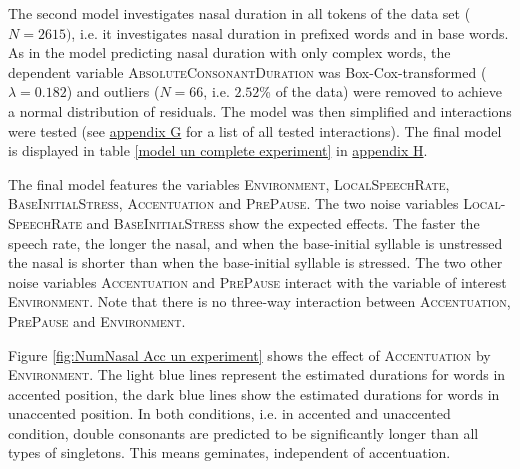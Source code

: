 The second model investigates nasal duration in all tokens of the data set ($N=2615)$, i.e. it investigates nasal duration in prefixed words and in base words. 
As in the model predicting nasal duration with only complex words, the dependent variable \textsc{AbsoluteConsonantDuration} was Box-Cox-transformed ($\lambda= 0.182$) and outliers ($N=66$, i.e. $ 2.52$\% of the data) were removed to achieve a normal distribution of residuals. The model was then simplified and interactions were tested (see \hyperref[Appendix G Summaries of tested interactions in experimental study]{appendix G} for a list of all tested interactions). The final model is displayed in table \ref{model un complete experiment} in \hyperref[Appendix H: Model Summaries Experiment]{appendix H}.


The final model features the variables \textsc{Environment}, \textsc{LocalSpeechRate}, \textsc{BaseInitialStress}, \textsc{Accentuation} and \textsc{PrePause}.
The two noise variables \textsc{Local-SpeechRate} and \textsc{BaseInitialStress} show the expected effects. The faster the speech rate, the longer the nasal, and when the base-initial syllable is unstressed the nasal is shorter than when the base-initial syllable is stressed.
The two other noise variables \textsc{Accentuation} and \textsc{PrePause} interact with the variable of interest \textsc{Environment}. Note that there is no three-way interaction between  \textsc{Accentuation}, \textsc{PrePause} and \textsc{Environment}.

Figure \ref{fig:NumNasal Acc un experiment} shows the effect of \textsc{Accentuation} by \textsc{Environment}. The light blue lines represent the estimated durations for words  in accented position, the dark blue lines show the estimated durations for words in unaccented position. In both conditions, i.e. in accented and unaccented condition, double consonants are predicted to be significantly longer than all types of singletons. This means  geminates, independent of accentuation.

